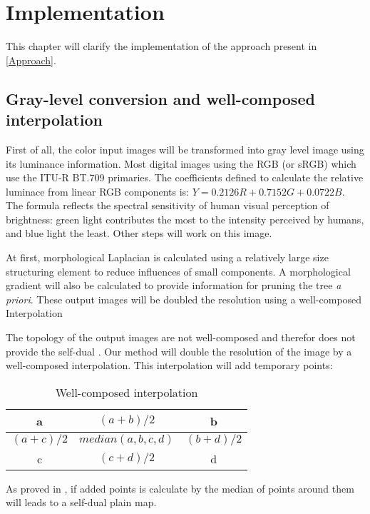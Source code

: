
\graphicspath{ {5chapterImplementation/image/} }
\chapter{Implementation}

This chapter will clarify the implementation of the approach present in \ref{Approach}. 
\section{Gray-level conversion and well-composed interpolation}
First of all, the color input images will be transformed into gray level image using its luminance information. Most digital images using the RGB (or sRGB) which use the ITU-R BT.709 primaries. The coefficients defined to calculate the relative luminace from linear RGB components is: $Y = 0.2126R + 0.7152G + 0.0722B$. The formula reflects the spectral sensitivity of human visual perception of brightness: green light contributes the most to the intensity perceived by humans, and blue light the least. Other steps will work on this image. 
\par At first, morphological Laplacian is calculated using a relatively large size structuring element to reduce influences of small components. A morphological gradient will also be calculated to provide information for pruning the tree \textit{a priori}. These output images will be doubled the resolution using a well-composed Interpolation 

\par The topology of the output images are not well-composed and therefor does not provide the self-dual . Our method will double the resolution of the image by a well-composed interpolation. This interpolation will add temporary points:
\par
\begin{table}
	\centering
	\begin{tabular}{|c|c|c|}
	\hline 
	a & ${(a+b)}/{2}$ & b \\ 
	\hline 
	${(a+c)}/{2}$ & $median(a,b,c,d)$ & ${(b+d)}/{2}$ \\ 
	\hline 
	c & ${(c+d)}/{2}$ & d \\ 
	\hline 

	\end{tabular}
	\caption{Well-composed interpolation} 
\end{table}

\par
As proved in \cite{geraud.15.ismm}, if added points is calculate by the median of points around them will leads to a self-dual plain map.


